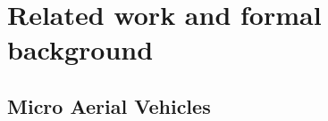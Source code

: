 \documentclass[a4paper,11pt,titlepage,twoside]{book}
\newcommand{\chapternoclear}[1]{
  \begingroup
  \let\cleardoublepage\clearpage
  \chapter{#1}
  \endgroup
}
\begin{document}

\chapternoclear{Related work and formal background}


\section{Micro Aerial Vehicles}
\end{document}
